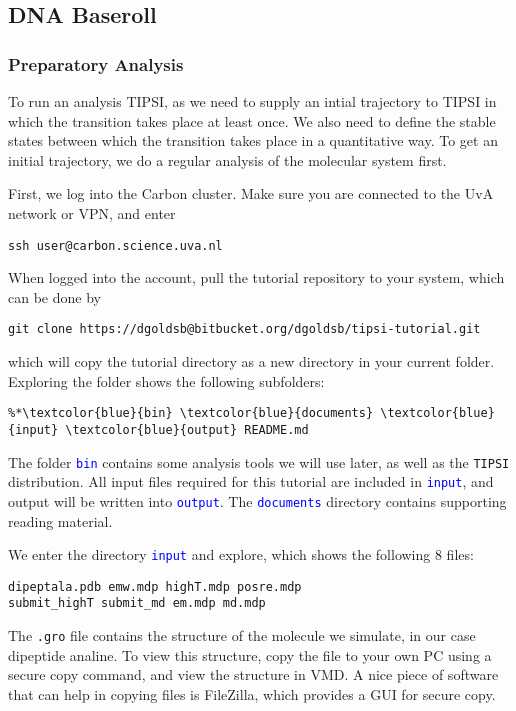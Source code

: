 \documentclass[]{article}
\begin{document}
\subsection*{DNA Baseroll}


\subsubsection*{Preparatory Analysis}

To run an analysis \textsc{TIPSI}, as we need to supply an intial trajectory to \textsc{TIPSI} in which the transition takes place at least once. We also need to define the stable states between which the transition takes place in a quantitative way. To get an initial trajectory, we do a regular analysis of the molecular system first.

First, we log into the Carbon cluster. Make sure you are connected to the UvA network or VPN, and enter
%
\begin{lstlisting}
ssh user@carbon.science.uva.nl
\end{lstlisting}
%
When logged into the account, pull the tutorial repository to your system, which can be done by
%
\begin{lstlisting}
git clone https://dgoldsb@bitbucket.org/dgoldsb/tipsi-tutorial.git
\end{lstlisting}
%
which will copy the tutorial directory as a new directory in your current folder. Exploring the folder shows the following subfolders:
%
\begin{lstlisting}
%*\textcolor{blue}{bin} \textcolor{blue}{documents} \textcolor{blue}{input} \textcolor{blue}{output} README.md
\end{lstlisting}
%
The folder \texttt{\textcolor{blue}{bin}} contains some analysis tools we will use later, as well as the \texttt{TIPSI} distribution. All input files required for this tutorial are included in \texttt{\textcolor{blue}{input}}, and output will be written into \texttt{\textcolor{blue}{output}}. The \texttt{\textcolor{blue}{documents}} directory contains supporting reading material.

We enter the directory \texttt{\textcolor{blue}{input}} and explore, which shows the following 8 files:
%
\begin{lstlisting}
dipeptala.pdb emw.mdp highT.mdp posre.mdp 
submit_highT submit_md em.mdp md.mdp
\end{lstlisting}
%
The \texttt{.gro} file contains the structure of the molecule we simulate, in our case dipeptide analine. To view this structure, copy the file to your own PC using a secure copy command, and view the structure in VMD. A nice piece of software that can help in copying files is FileZilla, which provides a GUI for secure copy.
\end{document}
